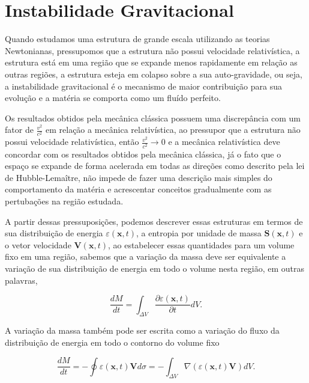 	\chapter*{Instabilidade Gravitacional}

Quando estudamos uma estrutura de grande escala utilizando as teorias Newtonianas, pressupomos que a estrutura não possui velocidade relativística, a estrutura está em uma região que se expande menos rapidamente em relação as outras regiões, a estrutura esteja em colapso sobre a sua auto-gravidade, ou seja, a instabilidade gravitacional é o mecanismo de maior contribuição para sua evolução e a matéria se comporta como um fluído perfeito.

Os resultados obtidos pela mecânica clássica possuem uma discrepância com um fator de $\frac{v^2}{c^2}$ em relação a mecânica relativística, ao pressupor que a estrutura não possui velocidade relativística, então $\frac{v^2}{c^2} \rightarrow 0$ e a mecânica relativística deve concordar com os resultados obtidos pela mecânica clássica, já o fato que o espaço se expande de forma acelerada em todas as direções como descrito pela lei de Hubble-Lemaître, não impede de fazer uma descrição mais simples do comportamento da matéria e acrescentar conceitos gradualmente com as pertubações na região estudada.

A partir dessas pressuposições, podemos descrever essas estruturas em termos de sua distribuição de energia $\varepsilon(\mathbf{x},t)$, a entropia por unidade de massa $\textbf{S}(\mathbf{x},t)$ e o vetor velocidade $\textbf{V}(\mathbf{x},t)$, ao estabelecer essas quantidades para um volume fixo em uma região, sabemos que a variação da massa deve ser equivalente a variação de sua distribuição de energia em todo o volume nesta região, em outras palavras, 

\begin{equation}\label{eq1}
	\frac{dM}{dt} = \int_{\Delta V} \frac{\partial \varepsilon(\mathbf{x},t)}{\partial t} dV.
\end{equation}

A variação da massa também pode ser escrita como a variação do fluxo da distribuição de energia em todo o contorno do volume fixo

\begin{equation}\label{eq2}
	\frac{dM}{dt} = - \oint \varepsilon(\mathbf{x},t)\mathbf{V} d\sigma = - \int_{\Delta V} \nabla (\varepsilon(\mathbf{x},t)\mathbf{V}) dV.
\end{equation}

